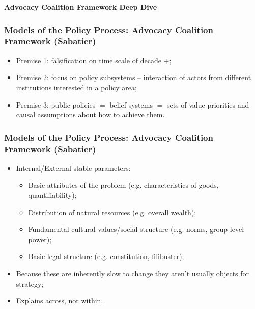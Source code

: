 \documentclass[aspectratio=169]{beamer}
\theoremstyle{principle}
\begin{document}
\begin{frame}

\begin{center}
\huge\textbf{Advocacy Coalition Framework Deep Dive}
\end{center}

\end{frame}

\begin{frame}
\frametitle{Models of the Policy Process: Advocacy Coalition Framework (Sabatier)}

\begin{itemize}
\item Premise 1: falsification on time scale of decade $+$;
\bigskip
\bigskip
\item Premise 2: focus on policy subsystems -- interaction of actors from different institutions interested in a policy area;
\bigskip
\bigskip
\item Premise 3: public policies $=$ belief systems $=$ sets of value priorities and causal assumptions about how to achieve them.
\end{itemize}

\end{frame}

\begin{frame}
\frametitle{Models of the Policy Process: Advocacy Coalition Framework (Sabatier)}
\begin{itemize}
\item Internal/External stable parameters:
\bigskip
\begin{itemize}
\item Basic attributes of the problem (e.g. characteristics of goods, quantifiability);
\bigskip
\item Distribution of natural resources (e.g. overall wealth);
\bigskip
\item Fundamental cultural values/social structure (e.g. norms, group level power);
\bigskip
\item Basic legal structure (e.g. constitution, filibuster);
\end{itemize}
\bigskip
\item Because these are inherently slow to change they aren't usually objects for strategy;
\bigskip
\item Explains across, not within.
\end{itemize}

\end{frame}
\end{document}
